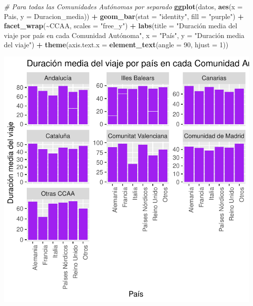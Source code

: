 \documentclass[data,article,submit,moreauthors,pdftex]{Definitions/mdpi}
\newenvironment{Shaded}{\begin{snugshade}}{\end{snugshade}}
\newcommand{\AttributeTok}[1]{\textcolor[rgb]{0.13,0.29,0.53}{#1}}
\newcommand{\CommentTok}[1]{\textcolor[rgb]{0.56,0.35,0.01}{\textit{#1}}}
\newcommand{\DecValTok}[1]{\textcolor[rgb]{0.00,0.00,0.81}{#1}}
\newcommand{\FunctionTok}[1]{\textcolor[rgb]{0.13,0.29,0.53}{\textbf{#1}}}
\newcommand{\NormalTok}[1]{#1}
\newcommand{\SpecialCharTok}[1]{\textcolor[rgb]{0.81,0.36,0.00}{\textbf{#1}}}
\newcommand{\StringTok}[1]{\textcolor[rgb]{0.31,0.60,0.02}{#1}}
\begin{document}
\begin{Shaded}
\begin{Highlighting}[]
\CommentTok{\# Para todas las Comunidades Autónomas por separado}
\FunctionTok{ggplot}\NormalTok{(datos, }\FunctionTok{aes}\NormalTok{(}\AttributeTok{x =}\NormalTok{ Pais, }\AttributeTok{y =}\NormalTok{ Duracion\_media)) }\SpecialCharTok{+} \FunctionTok{geom\_bar}\NormalTok{(}\AttributeTok{stat =} \StringTok{"identity"}\NormalTok{,}
    \AttributeTok{fill =} \StringTok{"purple"}\NormalTok{) }\SpecialCharTok{+} \FunctionTok{facet\_wrap}\NormalTok{(}\SpecialCharTok{\textasciitilde{}}\NormalTok{CCAA, }\AttributeTok{scales =} \StringTok{"free\_y"}\NormalTok{) }\SpecialCharTok{+}
    \FunctionTok{labs}\NormalTok{(}\AttributeTok{title =} \StringTok{"Duración media del viaje por país en cada Comunidad Autónoma"}\NormalTok{,}
        \AttributeTok{x =} \StringTok{"País"}\NormalTok{, }\AttributeTok{y =} \StringTok{"Duración media del viaje"}\NormalTok{) }\SpecialCharTok{+} \FunctionTok{theme}\NormalTok{(}\AttributeTok{axis.text.x =} \FunctionTok{element\_text}\NormalTok{(}\AttributeTok{angle =} \DecValTok{90}\NormalTok{,}
    \AttributeTok{hjust =} \DecValTok{1}\NormalTok{))}
\end{Highlighting}
\end{Shaded}

\includegraphics{ProyectoAED2024_Rmd_files/figure-latex/unnamed-chunk-22-1.pdf}
\end{document}

